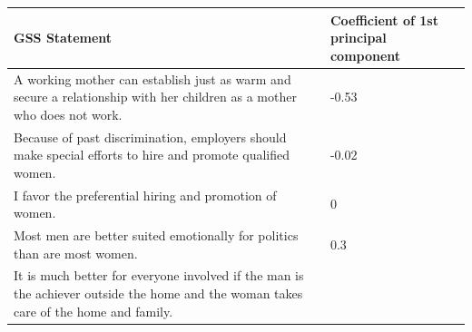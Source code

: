 \documentclass{article}
\begin{document}
\begin{longtable}[c]{@{}ll@{}}
\toprule
\begin{minipage}[b]{0.6\columnwidth}\raggedright\strut
GSS Statement
\strut\end{minipage} &
\begin{minipage}[b]{0.2\columnwidth}\raggedright\strut
Coefficient of 
\newline
1st principal 
\newline
component
\strut\end{minipage}\tabularnewline
\midrule
\endhead
\begin{minipage}[t]{0.6\columnwidth}\raggedright\strut
A working mother can establish just as warm and secure a relationship
with her children as a mother who does not work.
\strut\end{minipage} &
\begin{minipage}[t]{0.2\columnwidth}\raggedright\strut
-0.53
\strut\end{minipage}\tabularnewline
\begin{minipage}[t]{0.6\columnwidth}\raggedright\strut
Because of past discrimination, employers should make special efforts to
hire and promote qualified women.
\strut\end{minipage} &
\begin{minipage}[t]{0.2\columnwidth}\raggedright\strut
-0.02
\strut\end{minipage}\tabularnewline
\begin{minipage}[t]{0.6\columnwidth}\raggedright\strut
I favor the preferential hiring and promotion of women.
\strut\end{minipage} &
\begin{minipage}[t]{0.2\columnwidth}\raggedright\strut
0
\strut\end{minipage}\tabularnewline
\begin{minipage}[t]{0.6\columnwidth}\raggedright\strut
Most men are better suited emotionally for politics than are most women.
\strut\end{minipage} &
\begin{minipage}[t]{0.2\columnwidth}\raggedright\strut
0.3
\strut\end{minipage}\tabularnewline
\begin{minipage}[t]{0.6\columnwidth}\raggedright\strut
It is much better for everyone involved if the man is the achiever
outside the home and the woman takes care of the home and family.
\strut\end{minipage} &
\begin{minipage}[t]{0.2\columnwidth}\raggedright\strut

\end{minipage}
\end{longtable}
\end{document}
